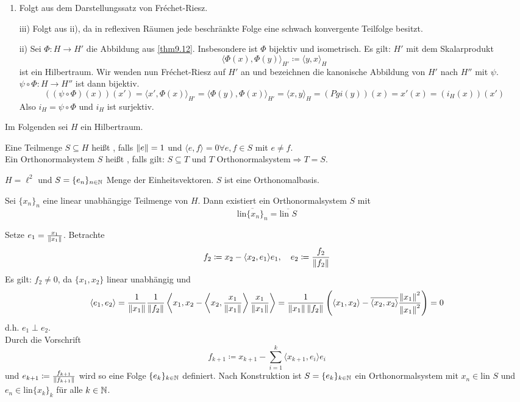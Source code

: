 \begin{beweis}
	\begin{enumerate}
		\item Folgt aus dem Darstellungssatz von Fr\'echet-Riesz.
		\item[iii)] Folgt aus ii), da in reflexiven R\"aumen jede beschr\"ankte Folge eine schwach konvergente Teilfolge besitzt.
		\item[ii)] Sei $ \Phi\colon H\rightarrow H' $ die Abbildung aus \ref{thm9.12}. Insbesondere ist $ \Phi $ bijektiv und isometrisch. Es gilt: $ H' $ mit dem Skalarprodukt
		\[ \langle\Phi(x),\Phi(y)\rangle_{H'}\coloneqq\langle y,x\rangle_H \]
		ist ein Hilbertraum. Wir wenden nun Fr\'echet-Riesz auf $ H' $ an und bezeichnen die kanonische Abbildung von $ H' $ nach $ H'' $ mit $ \psi $. $ \psi\circ\Phi\colon H\rightarrow H'' $ ist dann bijektiv.
		\[ ((\psi\circ\Phi)(x))(x')=\langle x',\Phi(x)\rangle_{H'}=\langle\Phi(y),\Phi(x)\rangle_{H'}=\langle x,y\rangle_H=(Pgi(y))(x)=x'(x)=(i_H(x))(x') \]
		Also $ i_H=\psi\circ\Phi $ und $ i_H $ ist surjektiv. 
	\end{enumerate}
\end{beweis}
Im Folgenden sei $ H $ ein Hilbertraum.
\begin{definition}
	Eine Teilmenge $ S\subseteq H $ hei\ss t , falls $ \left\|e\right\|=1 $ und $ \langle e,f\rangle=0\forall e,f\in S $ mit $ e\neq f $.\\
	Ein Orthonormalsystem $ S $ hei\ss t , falls gilt: $ S\subseteq T $ und $ T $ Orthonormalsystem$ \Rightarrow T=S $.
\end{definition}
\begin{beispiel*}
	$ H=\ell^2 $ und $ S=\lbrace e_n\rbrace_{n\in\mathbb{N}} $ Menge der Einheitsvektoren. $ S $ ist eine Orthonomalbasis.
\end{beispiel*}
\begin{satz}
	Sei $ \lbrace x_n\rbrace_n $ eine linear unabh\"angige Teilmenge von $ H $. Dann existiert ein Orthonormalsystem $ S $ mit
	\[ \overline{\text{lin}\lbrace x_n\rbrace_n}=\overline{\text{lin }S}\]
\end{satz}
\begin{beweis}
	Setze $ e_1=\frac{x_1}{\left\|x_1\right\|}$. Betrachte
	\[ f_2\coloneqq x_2-\langle x_2,e_1\rangle e_1,\quad e_2\coloneqq\frac{f_2}{\left\|f_2\right\|} \]
	Es gilt: $ f_2\neq 0 $, da $ \lbrace x_1,x_2\rbrace $ linear unabh\"angig und 
	\[ \langle e_1,e_2\rangle=\frac{1}{\left\|x_1\right\|}\frac{1}{\left\|f_2\right\|}\left\langle x_1,x_2-\left\langle x_2,\frac{x_1}{\left\|x_1\right\|}\right\rangle\frac{x_1}{\left\|x_1\right\|}\right\rangle=\frac{1}{\left\|x_1\right\|\left\|f_2\right\|}\left(\langle x_1,x_2\rangle-\overline{\langle x_2,x_2\rangle}\frac{\left\|x_1\right\|^2}{\left\|x_1\right\|^2}\right)=0 \]
	d.h. $ e_1\perp e_2 $.\\
	Durch die Vorschrift
	\[ f_{k+1}\coloneqq x_{k+1}-\sum_{i=1}^{k}\langle x_{k+1},e_i\rangle e_i \]
	und $ e_{k+1}\coloneqq\frac{f_{k+1}}{\left\|f_{k+1}\right\|} $ wird so eine Folge $ \lbrace e_k\rbrace_{k\in\mathbb{N}} $ definiert. Nach Konstruktion ist $ S=\lbrace e_k\rbrace_{k\in\mathbb{N}} $ ein Orthonormalsystem mit $ x_n\in\text{lin }S $ und $ e_n\in\text{lin}\lbrace x_k\rbrace_k $ f\"ur alle $ k\in\mathbb{N} $.
\end{beweis}
